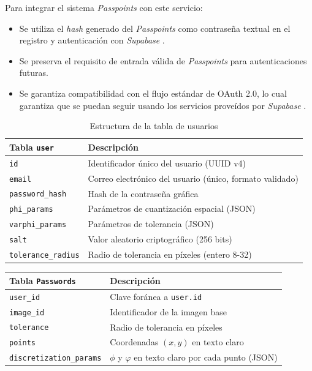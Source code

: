Para integrar el sistema \textit{Passpoints} con este servicio:
\begin{itemize}
	\item Se utiliza el \textit{hash} generado del \textit{Passpoints} como contraseña textual en el registro y autenticaci\'on con \textit{Supabase} .
	\item Se preserva el requisito de entrada válida de \textit{Passpoints} para autenticaciones futuras.
	\item Se garantiza compatibilidad con el flujo estándar de OAuth 2.0, lo cual garantiza que se puedan seguir usando los servicios prove\'idos por \textit{Supabase} \cite{supabase}.
\end{itemize}


\begin{table}[ht]
	\centering
	\caption{Estructura de la tabla de usuarios}
	\label{tab:bd-esquema}
	\begin{tabularx}{\textwidth}{lX}
		\toprule
		\textbf{Tabla \texttt{user}} & \textbf{Descripción} \\
		\midrule
		\texttt{id} & Identificador único del usuario (UUID v4) \\
		\texttt{email} & Correo electrónico del usuario (único, formato validado) \\
		\texttt{password\_hash} & Hash de la contraseña gráfica \\
		\texttt{phi\_params} & Parámetros de cuantización espacial (JSON) \\
		\texttt{varphi\_params} & Parámetros de tolerancia (JSON) \\
		\texttt{salt} & Valor aleatorio criptográfico (256 bits) \\
		\texttt{tolerance\_radius} & Radio de tolerancia en píxeles (entero 8-32) \\
	
		\bottomrule
	\end{tabularx}
\end{table}


\begin{table}[ht]
	\centering
	\begin{tabularx}{\textwidth}{lX}
		\toprule
		\textbf{Tabla \texttt{Passwords}} & \textbf{Descripción} \\
		\midrule
		\texttt{user\_id} & Clave foránea a \texttt{user.id} \\
		\texttt{image\_id} & Identificador de la imagen base \\
		\texttt{tolerance} & Radio de tolerancia en píxeles \\
		\texttt{points} & Coordenadas $(x,y)$ en texto claro \\
		\texttt{discretization\_params} & $\phi$ y $\varphi$ en texto claro por cada punto (JSON) \\
		\bottomrule
	\end{tabularx}
\end{table}

